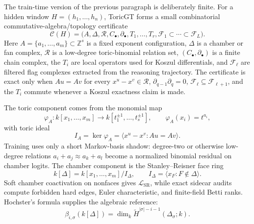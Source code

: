 \documentclass[11pt]{article}
\theoremstyle{definition}
\theoremstyle{plain}
\theoremstyle{remark}
\numberwithin{equation}{section}
\begin{document}
The train-time version of the previous paragraph is deliberately finite.  For a hidden window $H=(h_1,\ldots,h_n)$, ToricGT forms a small combinatorial commutative-algebra/topology certificate
\begin{equation}
  \mathcal C(H)=
  \bigl(A,\Delta,\mathcal R,C_\bullet,\partial_\bullet,
        T_1,\ldots,T_r,\mathcal F_1\subset\cdots\subset\mathcal F_L\bigr).
\end{equation}
Here $A=\{a_1,\ldots,a_m\}\subset\mathbb Z^s$ is a fixed exponent configuration, $\Delta$ is a chamber or fan complex, $\mathcal R$ is a low-degree toric-binomial relation set, $(C_\bullet,\partial_\bullet)$ is a finite chain complex, the $T_i$ are local operators used for Koszul differentials, and $\mathcal F_\ell$ are filtered flag complexes extracted from the reasoning trajectory.  The certificate is exact only when $Au=Av$ for every $x^u-x^v\in\mathcal R$, $\partial_{q-1}\partial_q=0$, $\mathcal F_\ell\subseteq\mathcal F_{\ell+1}$, and the $T_i$ commute whenever a Koszul exactness claim is made.

The toric component comes from the monomial map
\begin{equation}
  \varphi_A:k[x_1,\ldots,x_m]\to k[t_1^{\pm1},\ldots,t_s^{\pm1}],
  \qquad \varphi_A(x_i)=t^{a_i},
\end{equation}
with toric ideal
\begin{equation}
  I_A=\ker\varphi_A=\langle x^u-x^v:Au=Av\rangle.
\end{equation}
Training uses only a short Markov-basis shadow: degree-two or otherwise low-degree relations $a_i+a_j\approx a_k+a_l$ become a normalized binomial residual on chamber logits.  The chamber component is the Stanley--Reisner face ring
\begin{equation}
  k[\Delta]=k[x_1,\ldots,x_m]/I_\Delta,\qquad
  I_\Delta=\langle x_F:F\notin\Delta\rangle.
\end{equation}
Soft chamber coactivation on nonfaces gives $\mathcal L_{\mathrm{SR}}$, while exact sidecar audits compute forbidden hard edges, Euler characteristic, and finite-field Betti ranks.  Hochster's formula supplies the algebraic reference:
\begin{equation}
  \beta_{i,\sigma}(k[\Delta])
  =
  \dim_k\widetilde H^{|\sigma|-i-1}(\Delta_\sigma;k).
\end{equation}
\end{document}
